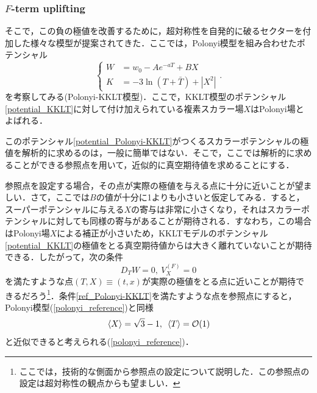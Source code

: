 \documentclass[a4paper,uplatex,dvipdfmx]{jsarticle}
\theoremstyle{definition}
\begin{document}
\subsubsection*{\texorpdfstring{$F$}{F}-term uplifting}

そこで，この負の極値を改善するために，超対称性を自発的に破るセクターを付加した様々な模型が提案されてきた．ここでは，Polonyi模型\cite{Polonyi_GeneralizationMassive_1977}を組み合わせたポテンシャル
\begin{equation}
   \left\{
      \begin{alignedat}{1}
         W
         &=
         w_{0}
         -
         Ae^{-aT}
         +
         BX
         \\
         K
         &=
         -
         3\ln(T+\bar{T})
         +
         |X^2|
      \end{alignedat}
   \right.
   .
   \label{potential_Polonyi-KKLT}
\end{equation}
を考察してみる(Polonyi-KKLT模型)．ここで，KKLT模型のポテンシャル\eqref{potential_KKLT}に対して付け加えられている複素スカラー場$X$はPolonyi場とよばれる．

このポテンシャル\eqref{potential_Polonyi-KKLT}がつくるスカラーポテンシャルの極値を解析的に求めるのは，一般に簡単ではない．そこで，ここでは解析的に求めることができる参照点を用いて，近似的に真空期待値を求めることにする．

参照点を設定する場合，その点が実際の極値を与える点に十分に近いことが望ましい．さて，ここでは$B$の値が十分に1よりも小さいと仮定してみる．すると，スーパーポテンシャルに与える$X$の寄与は非常に小さくなり，それはスカラーポテンシャルに対しても同様の寄与があることが期待される．すなわち，この場合はPolonyi場$X$による補正が小さいため，KKLTモデルのポテンシャル\eqref{potential_KKLT}の極値をとる真空期待値からは大きく離れていないことが期待できる．したがって，次の条件
\begin{equation}
   D_{T}W
   =
   0
   ,\ 
   V^{(F)}_{X}
   =
   0
   \label{ref_Polonyi-KKLT}
\end{equation}
を満たすような点$(T,X)\equiv(t,x)$が実際の極値をとる点に近いことが期待できるだろう\footnote{
   ここでは，技術的な側面から参照点の設定について説明した．この参照点の設定は超対称性の観点からも望ましい．
}．条件\eqref{ref_Polonyi-KKLT}を満たすような点を参照点にすると，Polonyi模型(\ref{polonyi_reference})と同様
\begin{equation}
   \ev*{X}
   =
   \sqrt{3}-1
   ,\ 
   \ev*{T}
   =
   \mathcal{O}(1)
   \label{ref_point}
\end{equation}
と近似できると考えられる(\ref{polonyi_reference})．
\end{document}
